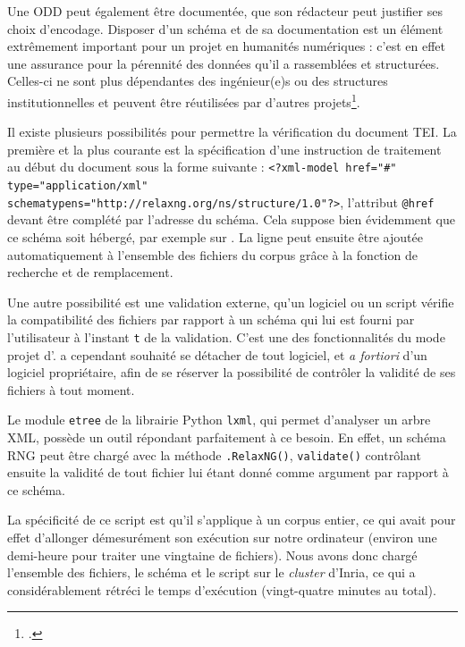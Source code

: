Une ODD peut également être documentée, \cad{} que son rédacteur peut justifier ses choix d'encodage. Disposer d'un schéma et de sa documentation est un élément extrêmement important pour un projet en humanités numériques : c'est en effet une assurance pour la pérennité des données qu'il a rassemblées et structurées. Celles-ci ne sont plus dépendantes des ingénieur(e)s ou des structures institutionnelles et peuvent être réutilisées par d'autres projets\footcite[p. 61]{jolivet}.

Il existe plusieurs possibilités pour permettre la vérification du document TEI. La première et la plus courante est la spécification d'une instruction de traitement au début du document sous la forme suivante : \texttt{<?xml-model href="\#" type="application/xml" schematypens="http://relaxng.org/ns/structure/1.0"?>}, l'attribut \texttt{@href} devant être complété par l'adresse du schéma. Cela suppose bien évidemment que ce schéma soit hébergé, par exemple sur \gitlab. La ligne peut ensuite être ajoutée automatiquement à l'ensemble des fichiers du corpus grâce à la fonction de recherche et de remplacement.

Une autre possibilité est une validation externe, \cad{} qu'un logiciel ou un script vérifie la compatibilité des fichiers par rapport à un schéma qui lui est fourni par l'utilisateur à l'instant \texttt{t} de la validation. C'est une des fonctionnalités du mode \og projet \fg{} d'\oxygen. \timeus{} a cependant souhaité se détacher de tout logiciel, et \textit{a fortiori} d'un logiciel propriétaire, afin de se réserver la possibilité de contrôler la validité de ses fichiers à tout moment.

Le module \texttt{etree} de la librairie Python \texttt{lxml}, qui permet d'analyser un arbre XML, possède un outil répondant parfaitement à ce besoin. En effet, un schéma RNG peut être chargé avec la méthode \texttt{.RelaxNG()}, \texttt{validate()} contrôlant ensuite la validité de tout fichier lui étant donné comme argument par rapport à ce schéma.

La spécificité de ce script est qu'il s'applique à un corpus entier, ce qui avait pour effet d'allonger démesurément son exécution sur notre ordinateur (environ une demi-heure pour traiter une vingtaine de fichiers). Nous avons donc chargé l'ensemble des fichiers, le schéma et le script sur le \textit{cluster} \rioc{} d'Inria, ce qui a considérablement rétréci le temps d'exécution (vingt-quatre minutes au total).

\clearpage

